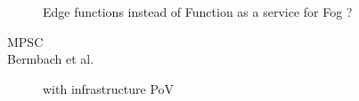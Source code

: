 \documentclass[11pt]{sdm}
\begin{document}
\begin{description}
	 Edge functions instead of Function as a service for Fog ?
	
	\item[MPSC]
	\item[Bermbach et al.] with infrastructure PoV
\end{description}








\end{document}
